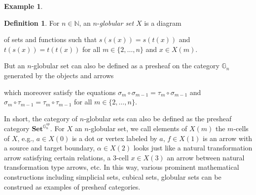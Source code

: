 \documentclass[a4paper]{book}
\theoremstyle{definition}
\newtheorem{example}{Example}[section]
\theoremstyle{definition}
\newtheorem{definition}{Definition}[section]
\theoremstyle{definition}
\theoremstyle{theorem}
\theoremstyle{definition}
\begin{document}
\begin{example}
			\begin{definition}
			For $n \in \mathbb{N}$, an $n$-\textit{globular set} $X$ is a diagram 
			\begin{center} 
			\end{center} 
		of sets and functions such that $s(s(x)) = s(t(x))$ and $t(s(x)) = t(t(x))$ for all $m \in \{2,\dots,n\}$ and $x \in X(m)$. \par 
		But an $n$-globular set can also be defined as a presheaf on the category $\mathbb{G}_n$ generated by the objects and arrows 
		\begin{center} 
		\end{center}
	which moreover satisfy the equations $\sigma_m \circ \sigma_{m-1} = \tau_m \circ \sigma_{m-1}$ and $\sigma_m \circ \tau_{m-1} = \tau_m \circ \tau_{m-1}$ for all $m \in \{2,\dots, n\}$.  
			\end{definition}
	In short, the category of $n$-globular sets can also be defined as the presheaf category $\textbf{Set}^{\mathbb{G}_n^{op}}$. For $X$ an $n$-globular set, we call elements of $X(m)$ the $m$-cells of $X$, e.g., $a \in X(0)$ is a dot or vertex labeled by $a$, $f \in X(1)$ is an arrow with a source and target boundary, $\alpha \in X(2)$ looks just like a natural transformation arrow satisfying certain relations, a 3-cell $x \in X(3)$ an arrow between natural transformation type arrows, etc. In this way, various prominent mathematical constructions including simplicial sets, cubical sets, globular sets can be construed as examples of presheaf categories.\par 

\end{example}
\end{document}
